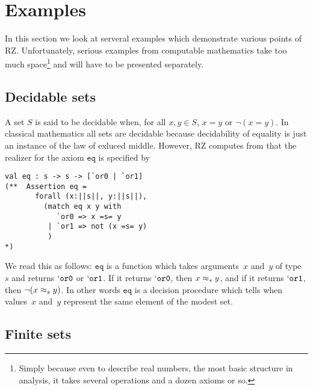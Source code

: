 \section{Examples}
\label{sec:examples}

In this section we look at serveral examples which demonstrate various
points of RZ. Unfortunately, serious examples from computable
mathematics take too much space\footnote{Simply because even to
  describe real numbers, the most basic structure in analysis, it
  takes several operations and a dozen axioms or so.} and will have to
be presented separately.

\subsection{Decidable sets}
\label{sec:decidable-sets}

A set $S$ is said to be decidable when, for all $x, y \in S$, $x = y$
or $\lnot (x = y)$. In classical mathematics all sets are decidable
because decidability of equality is just an instance of the law of
exluced middle. However, RZ computes from
%
%
that the realizer for the axiom $\mathtt{eq}$ is specified by
%
\begin{verbatim}
val eq : s -> s -> [`or0 | `or1]
(**  Assertion eq =
       forall (x:||s||, y:||s||),
         (match eq x y with
            `or0 => x =s= y
          | `or1 => not (x =s= y)
          )
*)
\end{verbatim}
%
We read this as follows: $\mathtt{eq}$ is a function which takes
arguments~$x$ and~$y$ of type~$s$ and returns $\mathtt{`or0}$ or
$\mathtt{`or1}$. If it returns $\mathtt{`or0}$, then $x \approx_s y$, and
if it returns $\mathtt{`or1}$, then $\lnot (x \approx_s y)$. In other
words $\mathtt{eq}$ is a decision procedure which tells when
values~$x$ and~$y$ represent the same element of the modest set.


\subsection{Finite sets}
\label{sec:finite-sets}


